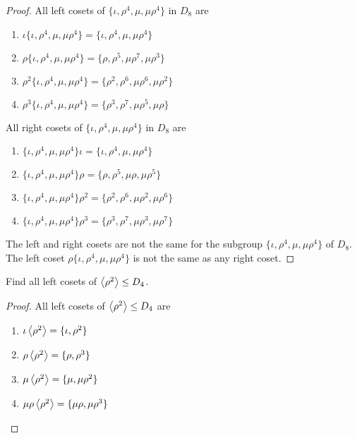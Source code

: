 \begin{proof}
    All left cosets of $\{ \iota, \rho^{4}, \mu, \mu\rho^{4} \}$ in $D_{8}$ are
    \begin{enumerate}[label={(\arabic*)}]
        \item $\iota\{ \iota, \rho^{4}, \mu, \mu\rho^{4} \} = \{ \iota, \rho^{4}, \mu, \mu\rho^{4} \}$
        \item $\rho\{ \iota, \rho^{4}, \mu, \mu\rho^{4} \} = \{ \rho, \rho^{5}, \mu\rho^{7}, \mu\rho^{3} \}$
        \item $\rho^{2}\{ \iota, \rho^{4}, \mu, \mu\rho^{4} \} = \{ \rho^{2}, \rho^{6}, \mu\rho^{6}, \mu\rho^{2} \}$
        \item $\rho^{3}\{ \iota, \rho^{4}, \mu, \mu\rho^{4} \} = \{ \rho^{3}, \rho^{7}, \mu\rho^{5}, \mu\rho \}$
    \end{enumerate}

    All right cosets of $\{ \iota, \rho^{4}, \mu, \mu\rho^{4} \}$ in $D_{8}$ are
    \begin{enumerate}[label={(\arabic*)}]
        \item $\{ \iota, \rho^{4}, \mu, \mu\rho^{4} \}\iota = \{ \iota, \rho^{4}, \mu, \mu\rho^{4} \}$
        \item $\{ \iota, \rho^{4}, \mu, \mu\rho^{4} \}\rho = \{ \rho, \rho^{5}, \mu\rho, \mu\rho^{5} \}$
        \item $\{ \iota, \rho^{4}, \mu, \mu\rho^{4} \}\rho^{2} = \{ \rho^{2}, \rho^{6}, \mu\rho^{2}, \mu\rho^{6} \}$
        \item $\{ \iota, \rho^{4}, \mu, \mu\rho^{4} \}\rho^{3} = \{ \rho^{3}, \rho^{7}, \mu\rho^{3}, \mu\rho^{7} \}$
    \end{enumerate}

    The left and right cosets are not the same for the subgroup $\{ \iota, \rho^{4}, \mu, \mu\rho^{4} \}$ of $D_{8}$. The left coset $\rho\{ \iota, \rho^{4}, \mu, \mu\rho^{4} \}$ is not the same as any right coset.
\end{proof}

\begin{exercise}
    Find all left cosets of $\left\langle{\rho^{2}}\right\rangle \leq D_{4}$.
\end{exercise}

\begin{proof}
    All left cosets of $\left\langle{\rho^{2}}\right\rangle \leq D_{4}$ are
    \begin{enumerate}[label={(\arabic*)}]
        \item $\iota\left\langle{\rho^{2}}\right\rangle = \{ \iota, \rho^{2} \}$
        \item $\rho\left\langle{\rho^{2}}\right\rangle = \{ \rho, \rho^{3} \}$
        \item $\mu\left\langle{\rho^{2}}\right\rangle = \{ \mu, \mu\rho^{2} \}$
        \item $\mu\rho\left\langle{\rho^{2}}\right\rangle = \{ \mu\rho, \mu\rho^{3} \}$
    \end{enumerate}
\end{proof}

